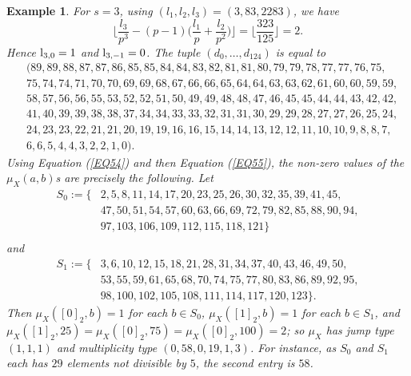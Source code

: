 \documentclass[11pt]{amsart}
\newtheorem{ex}[theorem]{Example}
\def\l{\textup{l}}
\begin{document}
\begin{ex}
For $s=3$, using $(l_1,l_2,l_3)=(3,83,2283)$, we have
$$\Big\lfloor\frac{l_3}{p^3}-(p-1)\Big(\frac{l_1}{p}+\frac{l_2}{p^2}\Big)\Big\rfloor=\Big\lfloor\frac{323}{125}\Big\rfloor=2.$$ Hence $\l_{3,0}=1$ and $\l_{3,-1}=0$. The tuple $(d_0,\ldots,d_{124})$ is equal to
\[
\begin{aligned}
&(89,89,88,87,87,86,85,85,84,84,83,82,81,81,80,79,79,78,77,77,76,75,\\
&75,74,74,71,70,70,69,69,68,67,66,66,65,64,64,63,63,62,61,60,60,59,59,\\
&58,57,56,56,55,53,52,52,51,50,49,49,48,48,47,46,45,45,44,44,43,42,42,\\
&41,40,39,39,38,38,37,34,34,33,33,32,31,31,30,29,29,28,27,27,26,25,24,\\
&24,23,23,22,21,21,20,19,19,16,16,15,14,14,13,12,12,11,10,10,9,8,8,7,\\
&6,6,5,4,4,3,2,2,1,0).
\end{aligned}
\]
Using Equation (\ref{EQ54}) and then Equation (\ref{EQ55}), the non-zero values of the $\mu_X(a,b)$s are precisely the following. Let
\[
\begin{aligned}
S_0:=\{&2,5,8,11,14,17,20,23,25,26,30,32,35,39,41,45,\\
       &47,50,51,54,57,60,63,66,69,72,79,82,85,88,90,94,\\
       &97,103,106,109,112,115,118,121\}\\
   \end{aligned}
\]   
and
\[
\begin{aligned}       
S_1:=\{&3,6,10,12,15,18,21,28,31,34,37,40,43,46,49,50,\\
       &53,55,59,61,65,68,70,74,75,77,80,83,86,89,92,95,\\
       &98,100,102,105,108,111,114,117,120,123\}.
\end{aligned}
\]
Then $\mu_X([0]_2,b)=1$ for each $b\in S_0$, $\mu_X([1]_2,b)=1$ for each $b\in S_1$, and $\mu_X([1]_2,25)=\mu_X([0]_2,75)=\mu_X([0]_2,100)=2$; so $\mu_X$ has jump type $(1,1,1)$ and multiplicity type $(0,58,0,19,1,3)$. For instance, as $S_0$ and $S_1$ each has $29$ elements not divisible by $5$, the second entry is $58$.
\end{ex}
\end{document}
